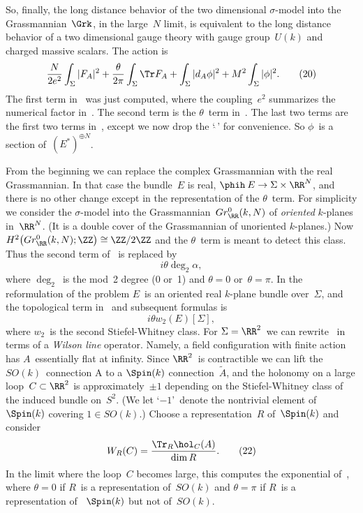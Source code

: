 So, finally, the long distance behavior of the two dimensional $\sigma
$-model into the Grassmannian~$\Grk$, in the large~$N$ limit, is equivalent
to the long distance behavior of a two dimensional gauge theory with gauge
group~$U(k)$ and charged massive scalars.  The action is 
  $$ \frac{N}{2e^2}\int_{\Sigma }|F_A|^2 + \frac{\theta }{2\pi }\int_{\Sigma
     }\Tr F_A + \int_{\Sigma }|d_A\phi |^2 + M^2\int_{\Sigma }|\phi
     |^2. \tag{20} $$
The first term in~ was just computed, where the coupling~$e^2$
summarizes the numerical factor in~.  The second term is the
$\theta $~term in~.  The last two terms are the first two terms
in~, except we now drop the `$\hat{\ }$' for convenience.  So
$\phi $~is a section of~$(E^*)^{\oplus N}$.


From the beginning we can replace the complex Grassmannian with the real
Grassmannian.  In that case the bundle~$E$ is real, $\phih\:E\to\Sigma \times
\RR^N$, and there is no other change except in the representation of the
$\theta $~term.  For simplicity we consider the $\sigma $-model into the
Grassmannian~$Gr_\RR^0(k,N)$ of {\it oriented\/} $k$-planes in~$\RR^N$.  (It
is a double cover of the Grassmannian of unoriented $k$-planes.)  Now
$H^2\bigl(Gr_\RR^0(k,N);\ZZ \bigr)\cong \ZZ/2\ZZ$ and the $\theta $~term is
meant to detect this class.  Thus the second term of~ is replaced
by
  $$ i\theta \deg_2\alpha ,  $$
where $\deg_2$~is the mod~2 degree (0 or~1) and $\theta =0$ or~$\theta =\pi
$.  In the reformulation of the problem $E$~is an oriented real $k$-plane
bundle over~$\Sigma$, and the topological term in~ and subsequent
formulas is
  $$ i\theta w_2(E)[\Sigma ], \tag{21} $$
where $w_2$~is the second Stiefel-Whitney class.  For $\Sigma =\RR^2$~we can
rewrite~ in terms of a {\it Wilson line\/} operator.  Namely, a
field configuration with finite action~ has $A$~essentially flat
at infinity.  Since $\RR^2$~is contractible we can lift the
$SO(k)$~connection A to a $\Spin(k)$ connection~$\tilde{A}$, and the holonomy
on a large loop~$C\subset \RR^2$ is approximately~$\pm1$ depending on the
Stiefel-Whitney class of the induced bundle on~$S^2$.  (We let `$-1$'~denote
the nontrivial element of~$\Spin(k)$ covering $1\in SO(k)$.)  Choose a
representation~$R$ of~$\Spin(k)$ and consider
  $$ W_R(C) = \frac{\Tr_R\hol_C(A)}{\dim R}. \tag{22} $$
In the limit where the loop~$C$ becomes large, this computes the exponential
of~, where $\theta =0$ if $R$~is a representation of~$SO(k)$ and
$\theta =\pi $ if $R$~is a representation of ~$\Spin(k)$ but not of~$SO(k)$.
 
